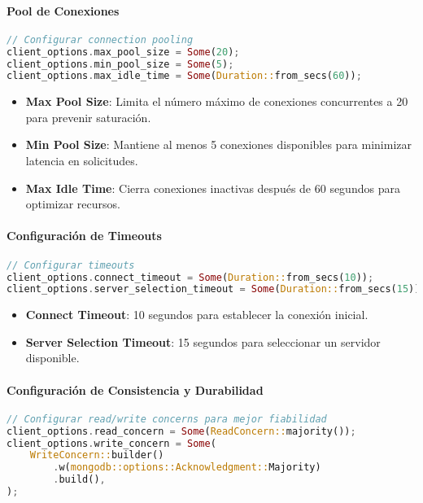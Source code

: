 \documentclass[12pt,letterpaper]{article}
\begin{document}
\paragraph{Pool de Conexiones}
\begin{lstlisting}[language=rust]
// Configurar connection pooling
client_options.max_pool_size = Some(20);
client_options.min_pool_size = Some(5);
client_options.max_idle_time = Some(Duration::from_secs(60));
\end{lstlisting}

\begin{itemize}
    \item \textbf{Max Pool Size}: Limita el número máximo de conexiones concurrentes a 20 para prevenir saturación.
    \item \textbf{Min Pool Size}: Mantiene al menos 5 conexiones disponibles para minimizar latencia en solicitudes.
    \item \textbf{Max Idle Time}: Cierra conexiones inactivas después de 60 segundos para optimizar recursos.
\end{itemize}

\paragraph{Configuración de Timeouts}
\begin{lstlisting}[language=rust]
// Configurar timeouts
client_options.connect_timeout = Some(Duration::from_secs(10));
client_options.server_selection_timeout = Some(Duration::from_secs(15));
\end{lstlisting}

\begin{itemize}
    \item \textbf{Connect Timeout}: 10 segundos para establecer la conexión inicial.
    \item \textbf{Server Selection Timeout}: 15 segundos para seleccionar un servidor disponible.
\end{itemize}

\paragraph{Configuración de Consistencia y Durabilidad}
\begin{lstlisting}[language=rust]
// Configurar read/write concerns para mejor fiabilidad
client_options.read_concern = Some(ReadConcern::majority());
client_options.write_concern = Some(
    WriteConcern::builder()
        .w(mongodb::options::Acknowledgment::Majority)
        .build(),
);
\end{lstlisting}
\end{document}
